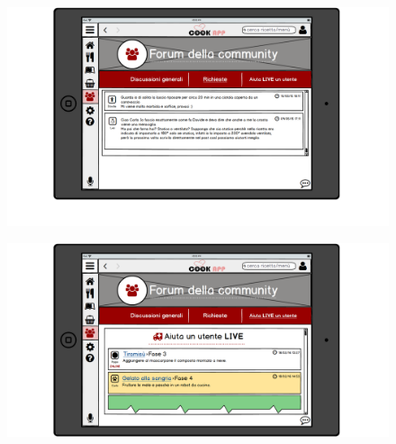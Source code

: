 \begin{itemize}
\begin{figure}[H]
\end{figure}
\begin{figure}[H]
	\centering
	\includegraphics[width=0.95\linewidth]{img/mockup/Community4.png}
\end{figure}
\begin{figure}[H]
	\centering
	\includegraphics[width=0.95\linewidth]{img/mockup/Community5.png}
\end{figure}


\end{itemize}
